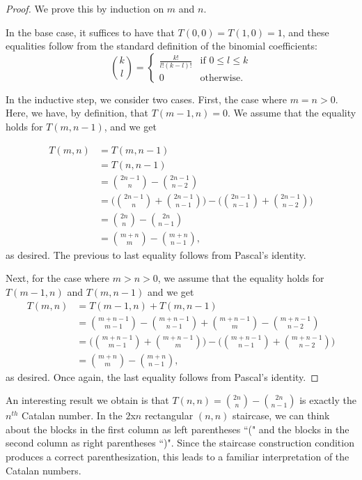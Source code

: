 \documentclass[12pt]{amsart}
\begin{document}
\begin{proof}
We prove this by induction on $m$ and $n$.

In the base case, it suffices to have that $T(0,0) = T(1,0) = 1$, and these equalities follow from the standard definition of the binomial coefficients:
$$
\binom{k}{l} =
\begin{cases}
\frac{k!}{l!(k-l)!} & \text{if } 0 \leq l \leq k \\
0 & \text{otherwise.}
\end{cases}
$$

In the inductive step, we consider two cases. First, the case where $m=n>0$. Here, we have, by definition, that $T(m-1,n)=0$. We assume that the equality holds for $T(m,n-1)$, and we get

\begin{align*}
T(m,n) & = T(m,n-1) \\
& = T(n,n-1) \\
& = \binom{2n-1}{n} - \binom{2n-1}{n-2} \\
& = \Bigg(\binom{2n-1}{n} + \binom{2n-1}{n-1}\Bigg)-\Bigg(\binom{2n-1}{n-1} + \binom{2n-1}{n-2}\Bigg) \\
& = \binom{2n}{n} - \binom{2n}{n-1} \\
& = \binom{m+n}{m} - \binom{m+n}{n-1},
\end{align*}
as desired. The previous to last equality follows from Pascal's identity.

Next, for the case where $m>n>0$, we assume that the equality holds for $T(m-1,n)$ and $T(m,n-1)$ and we get
\begin{align*}
T(m,n) & = T(m-1,n) + T(m,n-1) \\
& = \binom{m+n-1}{m-1} - \binom{m+n-1}{n-1} + \binom{m+n-1}{m} - \binom{m+n-1}{n-2} \\
& = \Bigg(\binom{m+n-1}{m-1} + \binom{m+n-1}{m}\Bigg) - \Bigg(\binom{m+n-1}{n-1} + \binom{m+n-1}{n-2}\Bigg) \\
& = \binom{m+n}{m} - \binom{m+n}{n-1},
\end{align*}
as desired. Once again, the last equality follows from Pascal's identity.
\end{proof}

An interesting result we obtain is that $T(n,n) = \binom{2n}{n} - \binom{2n}{n-1}$ is exactly the $n^{th}$ Catalan number. In the $2$x$n$ rectangular $(n,n)$ staircase, we can think about the blocks in the first column as left parentheses ``(" and the blocks in the second column as right parentheses ``)". Since the staircase construction condition produces a correct parenthesization, this leads to a familiar interpretation of the Catalan numbers. 
\end{document}
